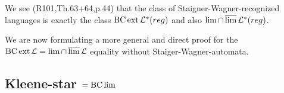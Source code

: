 We see (R101,Th.63+64,p.44) that the class of Staigner-Wagner-recognized languages is exactly the class $\operatorname{BC} \operatorname{ext} \mathcal{L}^*(reg)$ and also $\lim \cap \operatorname{\overline{lim}} \mathcal{L}^*(reg)$.

We are now formulating a more general and direct proof for the $\operatorname{BC} \operatorname{ext} \mathcal{L} = \lim \cap \operatorname{\overline{lim}} \mathcal{L}$ equality without Staiger-Wagner-automata.



\subsection{Kleene-star $= \operatorname{BC} \lim$}
\label{gen:kleene-star}

